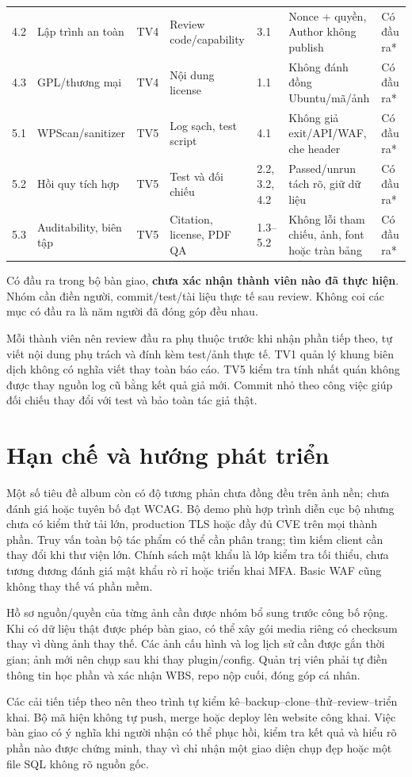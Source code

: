 \begin{longtable}{P{0.9cm}P{2.6cm}P{0.8cm}P{2.6cm}P{1.2cm}P{3.5cm}P{2.1cm}}
4.2 & Lập trình an toàn & TV4 & Review code/capability & 3.1 & Nonce + quyền, Author không publish & Có đầu ra*\\
4.3 & GPL/thương mại & TV4 & Nội dung license & 1.1 & Không đánh đồng Ubuntu/mã/ảnh & Có đầu ra*\\
5.1 & WPScan/sanitizer & TV5 & Log sạch, test script & 4.1 & Không giả exit/API/WAF, che header & Có đầu ra*\\
5.2 & Hồi quy tích hợp & TV5 & Test và đối chiếu & 2.2, 3.2, 4.2 & Passed/unrun tách rõ, giữ dữ liệu & Có đầu ra*\\
5.3 & Auditability, biên tập & TV5 & Citation, license, PDF QA & 1.3--5.2 & Không lỗi tham chiếu, ảnh, font hoặc tràn bảng & Có đầu ra*\\\bottomrule
\end{longtable}\endgroup
\noindent *Có đầu ra trong bộ bàn giao, \textbf{chưa xác nhận thành viên nào đã thực hiện}. Nhóm cần điền người, commit/test/tài liệu thực tế sau review. Không coi các mục có đầu ra là năm người đã đóng góp đều nhau.

Mỗi thành viên nên review đầu ra phụ thuộc trước khi nhận phần tiếp theo, tự viết nội dung phụ trách và đính kèm test/ảnh thực tế. TV1 quản lý khung biên dịch không có nghĩa viết thay toàn báo cáo. TV5 kiểm tra tính nhất quán không được thay nguồn log cũ bằng kết quả giả mới. Commit nhỏ theo công việc giúp đối chiếu thay đổi với test và bảo toàn tác giả thật.

\section{Hạn chế và hướng phát triển}
Một số tiêu đề album còn có độ tương phản chưa đồng đều trên ảnh nền; chưa đánh giá hoặc tuyên bố đạt WCAG. Bộ demo phù hợp trình diễn cục bộ nhưng chưa có kiểm thử tải lớn, production TLS hoặc đầy đủ CVE trên mọi thành phần. Truy vấn toàn bộ tác phẩm có thể cần phân trang; tìm kiếm client cần thay đổi khi thư viện lớn. Chính sách mật khẩu là lớp kiểm tra tối thiểu, chưa tương đương đánh giá mật khẩu rò rỉ hoặc triển khai MFA. Basic WAF cũng không thay thế vá phần mềm.

Hồ sơ nguồn/quyền của từng ảnh cần được nhóm bổ sung trước công bố rộng. Khi có dữ liệu thật được phép bàn giao, có thể xây gói media riêng có checksum thay vì dùng ảnh thay thế. Các ảnh cấu hình và log lịch sử cần được gắn thời gian; ảnh mới nên chụp sau khi thay plugin/config. Quản trị viên phải tự điền thông tin học phần và xác nhận WBS, repo nộp cuối, đóng góp cá nhân.

Các cải tiến tiếp theo nên theo trình tự kiểm kê--backup--clone--thử--review--triển khai. Bộ mã hiện không tự push, merge hoặc deploy lên website công khai. Việc bàn giao có ý nghĩa khi người nhận có thể phục hồi, kiểm tra kết quả và hiểu rõ phần nào được chứng minh, thay vì chỉ nhận một giao diện chụp đẹp hoặc một file SQL không rõ nguồn gốc.

